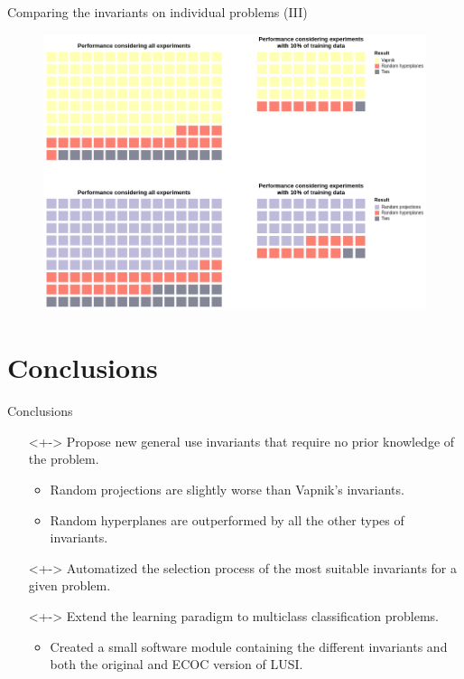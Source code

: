 \documentclass[10pt, dvipsnames]{beamer}
\begin{document}
\begin{frame}{Comparing the invariants on individual problems (III)}
    \begin{figure}
        \centering
        \includegraphics[width=\textwidth]{presentation/figures/invariants_performance_3.png}
    \end{figure}
\end{frame}

\section{Conclusions}

\begin{frame}{Conclusions}
    \begin{itemize}
        \item[\textcolor{Dandelion}{\checkmark}]<+-> Propose new general use invariants that require no prior
        knowledge of the problem.
        \begin{itemize}
            \item<+-> Random projections are slightly worse than Vapnik's invariants.
            \item<+-> Random hyperplanes are outperformed by all the other types of invariants.
        \end{itemize}
        \item[\textcolor{Red}{\XSolidBrush}]<+-> Automatized the selection process of the most suitable
        invariants for a given problem.
        \item[\textcolor{Green}{\checkmark}]<+-> Extend the learning paradigm to multiclass classification problems.
        \begin{itemize}
            \item<+-> Created a small software module containing the different invariants and both the original
            and ECOC version of LUSI.
        \end{itemize}
    \end{itemize}
\end{frame}
\end{document}
